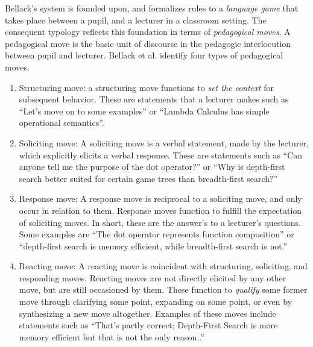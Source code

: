 \documentclass[conference]{IEEEtran}
\begin{document}
Bellack's system is founded upon, and formalizes rules to a \emph{language
  game}\cite{wittgenstein2010philosophical} that takes place between a pupil,
and a lecturer in a classroom setting. The consequent typology reflects this
foundation in terms of \emph{pedagogical moves}. A pedagogical move is the basic
unit of discourse in the pedagogic interlocution between pupil and lecturer.
Bellack et al. identify four types of pedagogical moves.
%
\begin{enumerate}[P1.]

  \item \label{contrib:struct}
    Structuring move: a structuring move functions to \emph{set the context} for
    subsequent behavior. These are statements that a lecturer makes such as
    ``Let's move on to some examples'' or ``Lambda Calculus has simple
    operational semantics''.
  
  \item \label{contrib:solicit}
    Soliciting move: A soliciting move is a verbal statement, made by the
    lecturer, which explicitly elicits a verbal response. These are statements
    such as ``Can anyone tell me the purpose of the dot operator?'' or ``Why is
    depth-first search better suited for certain game trees than breadth-first search?''

   \item \label{contrib:response}
     Response move: A response move is reciprocal to a soliciting move, and only
     occur in relation to them. Response moves function to fulfill the
     expectation of soliciting moves. In short, these are the answer's to a
     lecturer's questions. Some examples are ``The dot operator represents
     function composition'' or ``depth-first search is memory efficient, while
     breadth-first search is not.''

   \item \label{contrib:react}
     Reacting move: A reacting move is coincident with structuring, soliciting,
     and responding moves. Reacting moves are not directly elicited by any other
     move, but are still occasioned by them. These function to \emph{qualify}
     some former move through clarifying some point, expanding on some point, or
     even by synthesizing a new move altogether. Examples of these moves include
     statements such as ``That's partly correct; Depth-First Search is more
     memory efficient but that is not the only reason..''

\end{enumerate}
\end{document}
